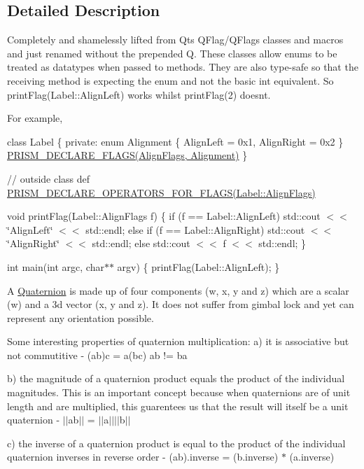 \subsection{Detailed Description}
Completely and shamelessly lifted from Qt\textquotesingle{}s Q\+Flag/\+Q\+Flags classes and macros and just renamed without the prepended \textquotesingle{}Q\textquotesingle{}. These classes allow enums to be treated as datatypes when passed to methods. They are also type-\/safe so that the receiving method is expecting the enum and not the basic int equivalent. So print\+Flag(\+Label\+::\+Align\+Left) works whilst print\+Flag(2) doesn\textquotesingle{}t.

For example,

class Label \{ private\+: enum Alignment \{ Align\+Left = 0x1, Align\+Right = 0x2 \} \hyperlink{_flags_8h_aa5aa2c9827ab949836e20999b9a068ec}{P\+R\+I\+S\+M\+\_\+\+D\+E\+C\+L\+A\+R\+E\+\_\+\+F\+L\+A\+G\+S(\+Align\+Flags, Alignment)} \}

// outside class def \hyperlink{_flags_8h_ae8aabb683a18b872a4449769b82e8e15}{P\+R\+I\+S\+M\+\_\+\+D\+E\+C\+L\+A\+R\+E\+\_\+\+O\+P\+E\+R\+A\+T\+O\+R\+S\+\_\+\+F\+O\+R\+\_\+\+F\+L\+A\+G\+S(\+Label\+::\+Align\+Flags)}

void print\+Flag(\+Label\+::\+Align\+Flags f) \{ if (f == Label\+::\+Align\+Left) std\+::cout $<$$<$ \char`\"{}\+Align\+Left\char`\"{} $<$$<$ std\+::endl; else if (f == Label\+::\+Align\+Right) std\+::cout $<$$<$ \char`\"{}\+Align\+Right\char`\"{} $<$$<$ std\+::endl; else std\+::cout $<$$<$ f $<$$<$ std\+::endl; \}

int main(int argc, char$\ast$$\ast$ argv) \{ print\+Flag(\+Label\+::\+Align\+Left); \}

A \hyperlink{classprism_1_1_quaternion}{Quaternion} is made up of four components (w, x, y and z) which are a scalar (w) and a 3d vector (x, y and z). It does not suffer from gimbal lock and yet can represent any orientation possible.

Some interesting properties of quaternion multiplication\+: a) it is associative but not commutitive -\/ (ab)c = a(bc) ab != ba

b) the magnitude of a quaternion product equals the product of the individual magnitudes. This is an important concept because when quaternions are of unit length and are multiplied, this guarentees us that the result will itself be a unit quaternion -\/ $\vert$$\vert$ab$\vert$$\vert$ = $\vert$$\vert$a$\vert$$\vert$$\vert$$\vert$b$\vert$$\vert$

c) the inverse of a quaternion product is equal to the product of the individual quaternion inverses in reverse order -\/ (ab).inverse = (b.\+inverse) $\ast$ (a.\+inverse)

